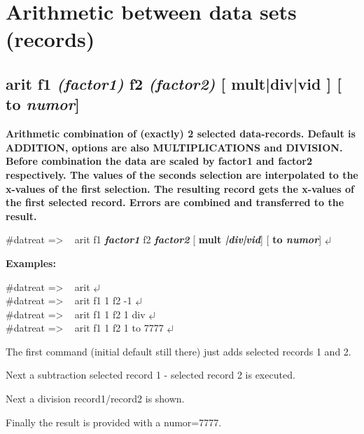 \documentclass[11pt,fleqn]{book} %
\newcommand{\linespace}{\vspace{4ex}}
\newcommand{\return}{$\carriagereturn$} %
\newcommand{\sysprompt}{{\color{green}...\textgreater} ~ }
\newcommand{\dtrprompt}{{\color{blue}\#datreat =\textgreater} ~ }
\newcommand{\enter}[1]{{\color{red} \bf #1}}
\newcommand{\var}[1]{{\color{red} \bf \it #1}}
\newcommand{\vol}[2]{{\color{magenta} \bf #1 \it #2}}
\begin{document}
\chapter{Arithmetic between data sets (records)}

\section{arit f1 \var{(factor1)}  f2 \var{(factor2)}  [\vol{mult|div|vid}{}] [\vol{to}{numor}]}
\vskip 1cm

\begin{exercise}
\bf
Arithmetic combination of (exactly) 2 selected data-records. Default is ADDITION, options are
also MULTIPLICATIONS and DIVISION. Before combination the data are scaled by factor1 and factor2
respectively. The values of the seconds selection are interpolated to the x-values of the first
selection. The resulting record gets the x-values of the first selected record.
Errors are combined and transferred to the result. 
\end{exercise}

\begin{corollary}
\dtrprompt arit f1 \var{factor1}  f2 \var{factor2} [\vol{mult}{|div|vid}] [\vol{to}{numor}]   \return 
\end{corollary}

\linespace
{\bf Examples:}
\begin{corollary}
\dtrprompt arit                       \return  \\
\dtrprompt arit f1 1 f2 -1            \return  \\
\dtrprompt arit f1 1 f2  1  div       \return  \\
\dtrprompt arit f1 1 f2  1  to  7777  \return  
\end{corollary}

The first command (initial default still there) just adds selected records 1 and 2.

Next a subtraction selected record 1 - selected record 2 is executed.

Next a division record1/record2 is shown.

Finally the result is provided with a numor=7777.
\newpage
\end{document}
